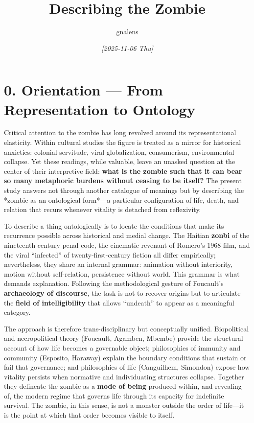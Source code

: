 \documentclass[11pt]{article}
\author{gnalens}
\date{\textit{{[}2025-11-06 Thu]}}
\title{Describing the Zombie}
\begin{document}
\maketitle
\section*{0. Orientation — From Representation to Ontology}
\label{sec:orgcbbac4e}

Critical attention to the zombie has long revolved around its representational elasticity. Within cultural studies the figure is treated as a mirror for historical anxieties: colonial servitude, viral globalization, consumerism, environmental collapse. Yet these readings, while valuable, leave an unasked question at the center of their interpretive field: \textbf{what is the zombie such that it can bear so many metaphoric burdens without ceasing to be itself?} The present study answers not through another catalogue of meanings but by describing the *zombie as an ontological form*—a particular configuration of life, death, and relation that recurs whenever vitality is detached from reflexivity.

To describe a thing ontologically is to locate the conditions that make its recurrence possible across historical and medial change. The Haitian \textbf{zonbi} of the nineteenth-century penal code, the cinematic revenant of Romero’s 1968 film, and the viral “infected” of twenty-first-century fiction all differ empirically; nevertheless, they share an internal grammar: animation without interiority, motion without self-relation, persistence without world. This grammar is what demands explanation. Following the methodological gesture of Foucault’s \textbf{archaeology of discourse}, the task is not to recover origins but to articulate the \textbf{field of intelligibility} that allows “undeath” to appear as a meaningful category.

The approach is therefore trans-disciplinary but conceptually unified. Biopolitical and necropolitical theory (Foucault, Agamben, Mbembe) provide the structural account of how life becomes a governable object; philosophies of immunity and community (Esposito, Haraway) explain the boundary conditions that sustain or fail that governance; and philosophies of life (Canguilhem, Simondon) expose how vitality persists when normative and individuating structures collapse. Together they delineate the zombie as a \textbf{mode of being} produced within, and revealing of, the modern regime that governs life through its capacity for indefinite survival. The zombie, in this sense, is not a monster outside the order of life—it is the point at which that order becomes visible to itself.
\end{document}
